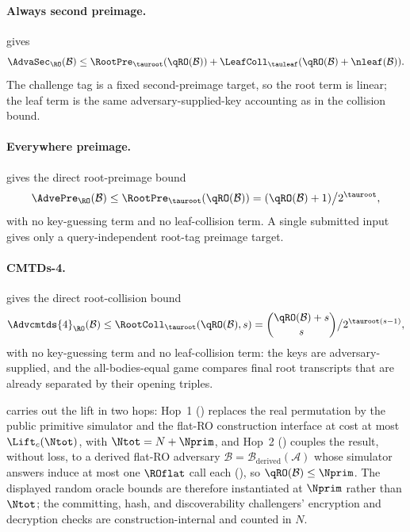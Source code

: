 \paragraph{Always second preimage.}
 gives
\[
  \AdvaSec_{\RO}(\mathcal{B})
  \leq \RootPre_{\tauroot}(\qRO(\mathcal{B}))
  + \LeafColl_{\tauleaf}(\qRO(\mathcal{B})+\nleaf(\mathcal{B})).
\]
The challenge tag is a fixed second-preimage target, so the root term is
linear; the leaf term is the same adversary-supplied-key accounting as in
the collision bound.

\paragraph{Everywhere preimage.}
 gives the direct root-preimage bound
\[
  \AdvePre_{\RO}(\mathcal{B})
  \leq \RootPre_{\tauroot}(\qRO(\mathcal{B}))
  = (\qRO(\mathcal{B}) + 1) \big/ 2^{\tauroot},
\]
with no key-guessing term and no leaf-collision term. A single submitted
input gives only a query-independent root-tag preimage target.

\paragraph{CMTDs-4.}
 gives the direct root-collision bound
\[
  \Advcmtds{4}_{\RO}(\mathcal{B})
  \leq \RootColl_{\tauroot}(\qRO(\mathcal{B}), s)
  = \binom{\qRO(\mathcal{B}) + s}{s} \big/ 2^{\tauroot (s - 1)},
\]
with no key-guessing term and no leaf-collision term: the keys are
adversary-supplied, and the all-bodies-equal game compares final root
transcripts that are already separated by their opening triples.

 carries out the lift in two hops: Hop~1
() replaces the real permutation by the \cite{BDPV08}
public primitive simulator and the flat-RO construction interface at cost
at most $\Lift_c(\Ntot)$, with $\Ntot = N + \Nprim$, and Hop~2
() couples the result, without loss, to a
derived flat-RO adversary
$\mathcal{B} = \mathcal{B}_{\text{derived}}(\mathcal{A})$ whose simulator
answers induce at most one $\ROflat$ call each
(), so $\qRO(\mathcal{B}) \leq \Nprim$. The
displayed random oracle bounds are therefore instantiated at $\Nprim$
rather than $\Ntot$; the committing, hash, and discoverability
challengers' encryption and decryption checks are construction-internal
and counted in $N$.

